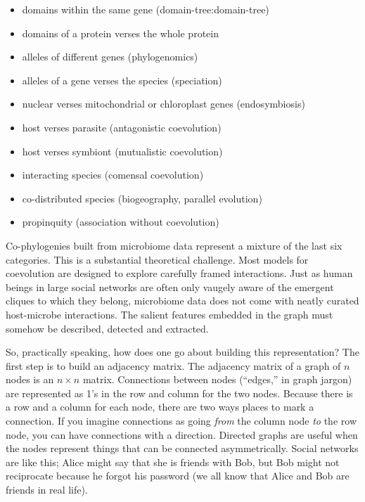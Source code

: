 \documentclass[
10pt, %
a4paper, %
oneside, %
headinclude,footinclude, %
BCOR5mm, %
]{scrartcl}
\begin{document}

\begin{itemize}
\item domains within the same gene (domain-tree:domain-tree)
\item domains of a protein verses the whole protein 
\item alleles of different genes (phylogenomics)
\item alleles of a gene verses the species (speciation)
\item nuclear verses mitochondrial or chloroplast genes (endosymbiosis)
\item host verses parasite (antagonistic coevolution)
\item host verses symbiont (mutualistic coevolution)
\item interacting species (comensal coevolution)
\item co-distributed species (biogeography, parallel evolution)
\item propinquity (association without coevolution)
\end{itemize}


Co-phylogenies built from microbiome data represent a mixture of the last six categories. This is a substantial theoretical challenge. Most models for coevolution are designed to explore carefully framed interactions. Just as human beings in large social networks are often only vaugely aware of the emergent cliques to which they belong, microbiome data does not come with neatly curated host-microbe interactions. The salient features embedded in the graph must somehow be described, detected and extracted.

So, practically speaking, how does one go about building this representation? The first step is to build an adjacency matrix. The adjacency matrix of a graph of $n$ nodes is an $n \times n$ matrix. Connections between nodes (``edges,'' in graph jargon) are represented as 1's in the row and column for the two nodes. Because there is a row and a column for each node, there are two ways places to mark a connection. If you imagine connections as going {\em from} the column node {\em to} the row node, you can have connections with a direction. Directed graphs are useful when the nodes represent things that can be connected asymmetrically. Social networks are like this; Alice might say that she is friends with Bob, but Bob might not reciprocate because he forgot his password (we all know that Alice and Bob are friends in real life). 
\end{document}
